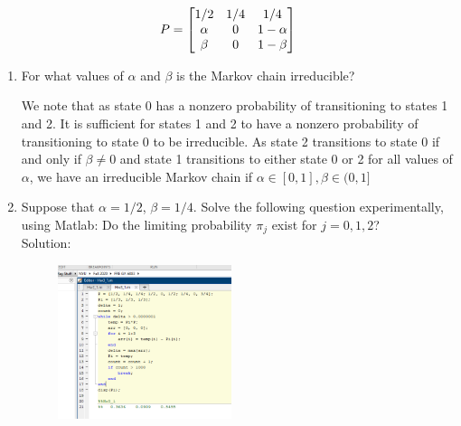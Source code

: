 \documentclass[12pt,twoside, letter]{exam}
\theoremstyle{definition}
\begin{document}
\begin{align*}
  \centering
  P =
    \begin{bmatrix}
      1/2 & 1/4 & 1/4 \\
      \alpha & 0 & 1 - \alpha \\
      \beta & 0 & 1- \beta
    \end{bmatrix}
\end{align*}
  \begin{enumerate}
    \item For what values of $\alpha$ and $\beta$ is the Markov chain irreducible?

      \begin{solution}
        We note that as state 0 has a nonzero probability of transitioning to states 1 and 2. It is sufficient for states 1 and 2 to have a nonzero probability of transitioning to
        state 0 to be irreducible. As state 2 transitions to state 0 if and only if $\beta \neq 0$ and state 1 transitions to either state 0 or 2 for all values of $\alpha$, we have an
        irreducible Markov chain if $\alpha \in [0,1], \beta \in (0,1]$
      \end{solution}

    \item Suppose that $\alpha = 1/2$, $\beta = 1/4$. Solve the following question experimentally, using Matlab: Do the limiting probability
      $\pi_{j}$ exist for $j = 0,1,2$? \\
      Solution:
        \begin{figure}[H]
          \centering
            \includegraphics[width=2in]{Hw3_1b}
        \end{figure}


\end{enumerate}
\end{document}
